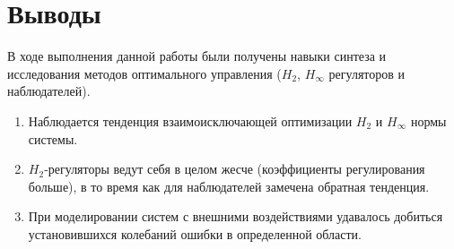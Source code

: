 \section{Выводы}
В ходе выполнения данной работы были получены навыки синтеза и исследования методов оптимального управления ($H_2$, $H_\infty$ регуляторов и наблюдателей).
\begin{enumerate}
    \item Наблюдается тенденция взаимоисключающей оптимизации $H_2$ и $H_\infty$ нормы системы.
    \item $H_2$-регуляторы ведут себя в целом жесче (коэффициенты регулирования больше), в то время как для наблюдателей замечена обратная тенденция.
    \item При моделировании систем с внешними воздействиями удавалось добиться установившихся колебаний ошибки в определенной области.
\end{enumerate}
\pagebreak